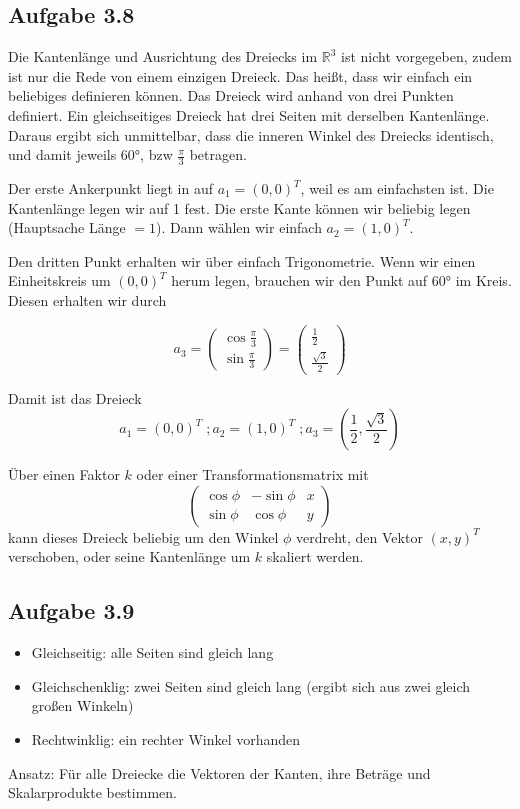 \documentclass{standalone}
\begin{document}
\subsection{Aufgabe 3.8}
Die Kantenlänge und Ausrichtung des Dreiecks im $\mathbb{R}^3$ ist nicht vorgegeben, zudem ist nur die Rede von einem einzigen Dreieck.
Das heißt, dass wir einfach ein beliebiges definieren können.
Das Dreieck wird anhand von drei Punkten definiert.
Ein gleichseitiges Dreieck hat drei Seiten mit derselben Kantenlänge.
Daraus ergibt sich unmittelbar, dass die inneren Winkel des Dreiecks identisch, und damit jeweils $60°$, bzw $\frac{\pi}{3}$ betragen.

Der erste Ankerpunkt liegt in auf $a_1 = (0,0)^T$, weil es am einfachsten ist. Die Kantenlänge legen wir auf 1 fest.
Die erste Kante können wir beliebig legen (Hauptsache Länge $= 1$). Dann wählen wir einfach $a_2 = (1,0)^T$.

Den dritten Punkt erhalten wir über einfach Trigonometrie. Wenn wir einen Einheitskreis um $(0,0)^T$ herum legen, brauchen wir den Punkt auf $60°$ im Kreis.
Diesen erhalten wir durch

$$a_3 = \begin{pmatrix}
    \cos \frac{\pi}{3} \\
    \sin \frac{\pi}{3}
\end{pmatrix}
= \begin{pmatrix}
    \frac{1}{2} \\
    \frac{\sqrt{3}}{2}
\end{pmatrix}$$

Damit ist das Dreieck
$$ a_1 = (0,0)^T \; ; a_2 = (1,0)^T \; ; a_3 = (\frac{1}{2}, \frac{\sqrt{3}}{2})$$

Über einen Faktor $k$ oder einer Transformationsmatrix mit $$\begin{pmatrix}
    \cos \phi & -\sin \phi & x\\
    \sin \phi & \cos \phi & y
\end{pmatrix}$$
kann dieses Dreieck beliebig um den Winkel $\phi$ verdreht, den Vektor $(x,y)^T$ verschoben, oder seine Kantenlänge um $k$ skaliert werden.

\subsection{Aufgabe 3.9}
\begin{itemize}
    \item Gleichseitig: alle Seiten sind gleich lang
    \item Gleichschenklig: zwei Seiten sind gleich lang (ergibt sich aus zwei gleich großen Winkeln)
    \item Rechtwinklig: ein rechter Winkel vorhanden
\end{itemize}
Ansatz: Für alle Dreiecke die Vektoren der Kanten, ihre Beträge und Skalarprodukte bestimmen.
\end{document}
